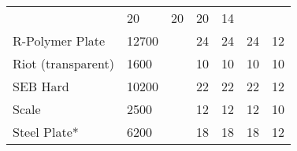 \documentclass[twoside]{book}
\begin{document}
\begin{longtable}{p{1.25in}llp{3em}p{3em}p{3em}p{3em}}
  &
   20 
  &
   20 
  &
   20 
  &
   14 
  \tabularnewline
      
  \raggedright
           R-Polymer Plate 
  &
   12700 
  &
  
  &
   24 
  &
   24 
  &
   24 
  &
   12 
  \tabularnewline
      
  \raggedright
           Riot (transparent) 
  &
   1600 
  &
  
  &
   10 
  &
   10 
  &
   10 
  &
   10 
  \tabularnewline
      
  \raggedright
           SEB Hard 
  &
   10200 
  &
  
  &
   22 
  &
   22 
  &
   22 
  &
   12 
  \tabularnewline
      
  \raggedright
           Scale 
  &
   2500 
  &
  
  &
   12 
  &
   12 
  &
   12 
  &
   10 
  \tabularnewline
      
  \raggedright
           Steel Plate* 
  &
   6200 
  &
  
  &
   18 
  &
   18 
  &
   18 
  &
   12 
  \tabularnewline
      
\end{longtable}
    
\end{document}
